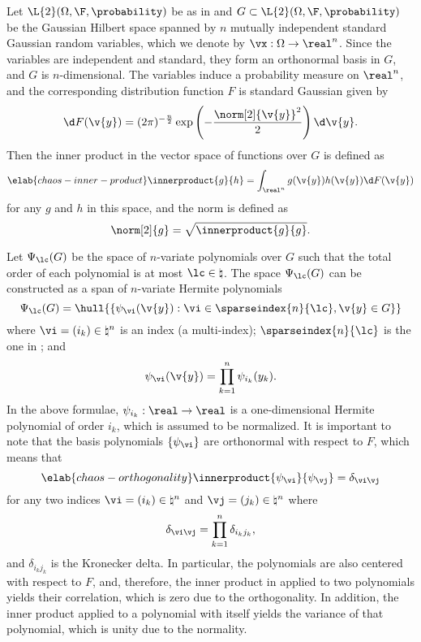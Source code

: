 Let $\L{2}(\Omega, \F, \probability)$ be as in 
and $G \subset \L{2}(\Omega, \F, \probability)$ be the Gaussian Hilbert space
\cite{janson1997} spanned by $n$ mutually independent standard Gaussian random
variables, which we denote by $\vx: \Omega \to \real^n$. Since the variables are
independent and standard, they form an orthonormal basis in $G$, and $G$ is
$n$-dimensional. The variables induce a probability measure on $\real^n$, and
the corresponding distribution function $F$ is standard Gaussian given by
\[
  \d F(\v{y}) = (2 \pi)^{-\frac{n}{2}} \exp\left(-\frac{\norm[2]{\v{y}}^2}{2}\right) \d \v{y}.
\]
Then the inner product in the vector space of functions over $G$ is defined as
\begin{equation} \elab{chaos-inner-product}
  \innerproduct{g}{h} = \int_{\real^n} g(\v{y}) h(\v{y}) \d F(\v{y})
\end{equation}
for any $g$ and $h$ in this space, and the norm is defined as
\[
  \norm[2]{g} = \sqrt{\innerproduct{g}{g}}.
\]

Let $\Psi_\lc(G)$ be the space of $n$-variate polynomials over $G$ such that the
total order of each polynomial is at most $\lc \in \natural$. The space
$\Psi_\lc(G)$ can be constructed as a span of $n$-variate Hermite polynomials
\cite{eldred2008, maitre2010}
\[
  \Psi_\lc(G) = \hull{\left\{ \psi_{\vi}(\v{y}): \vi \in \sparseindex{n}{\lc}, \v{y} \in G \right\}}
\]
where $\vi = (i_k) \in \natural^n$ is an index (a multi-index);
$\sparseindex{n}{\lc}$ is the one in ; and
\[
  \psi_{\vi}(\v{y}) = \prod_{k = 1}^n \psi_{i_k}(y_k).
\]
In the above formulae, $\psi_{i_k}: \real \to \real$ is a one-dimensional
Hermite polynomial of order $i_k$, which is assumed to be normalized. It is
important to note that the basis polynomials $\{ \psi_{\vi} \}$ are orthonormal
with respect to $F$, which means that
\begin{equation} \elab{chaos-orthogonality}
  \innerproduct{\psi_{\vi}}{\psi_{\vj}} = \delta_{\vi \vj}
\end{equation}
for any two indices $\vi = (i_k) \in \natural^n$ and $\vj = (j_k) \in
\natural^n$ where
\[
  \delta_{\vi \vj} = \prod_{k = 1}^n \delta_{i_k j_k},
\]
and $\delta_{i_k j_k}$ is the Kronecker delta. In particular, the polynomials
are also centered with respect to $F$, and, therefore, the inner product in
 applied to two polynomials yields their correlation,
which is zero due to the orthogonality. In addition, the inner product applied
to a polynomial with itself yields the variance of that polynomial, which is
unity due to the normality.

